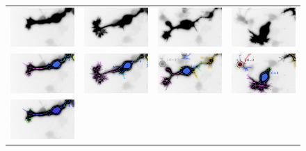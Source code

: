 \begin{figure}[t]
      \begin{tabular}{@{}c@{}c@{}c@{}c@{}}
        \includegraphics[width=31mm] {images/0_005.png} &
        \includegraphics[width=31mm] {images/0_008.png} & 
        \includegraphics[width=31mm] {images/0_017.png} & 
        \includegraphics[width=31mm] {images/0_026.png} \\ [-1ex]
        \includegraphics[width=31mm] {images/2_005.png} &
        \includegraphics[width=31mm] {images/2_008.png} & 
        \includegraphics[width=31mm] {images/2_017.png} & 
        \includegraphics[width=31mm] {images/2_026.png} \\ [-1ex]
        \includegraphics[width=31mm] {images/3_005.png} &

\end{tabular}
\end{figure}
